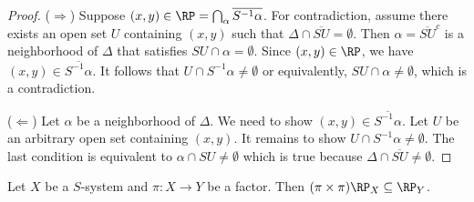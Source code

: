 \begin{proof}
\leanok{}
($\Rightarrow$) Suppose $(x, y) \in \RP = \bigcap_{\alpha} \overline{S^{-1} \alpha}$. For contradiction, assume there exists an open set $U$ containing $(x, y)$ such that $\Delta \cap \overline{S U} = \emptyset$. Then $\alpha = \overline{S U}^c$ is a neighborhood of $\Delta$ that satisfies $SU \cap \alpha = \emptyset$. Since $(x, y) \in \RP$, we have $(x, y) \in \overline{S^{-1} \alpha}$. It follows that $U \cap S^{-1} \alpha \neq \emptyset$ or equivalently, $SU \cap \alpha \neq \emptyset$, which is a contradiction.

($\Leftarrow$) Let $\alpha$ be a neighborhood of $\Delta$. We need to show $(x, y) \in \overline {S^{-1} \alpha}$. Let $U$ be an arbitrary open set containing $(x, y)$. It remains to show $U \cap S^{-1} \alpha \neq \emptyset$. The last condition is equivalent to $\alpha \cap SU \neq \emptyset$ which is true because $\Delta \cap \overline{S U} \neq \emptyset$.



    
\end{proof}

\begin{lemma}
    \label{lemma_frp_functorial_property}
    \leanok{}
    Let $X$ be a $S$-system and $\pi: X \to Y$ be a factor.  Then $(\pi \times \pi) \RP_X \subseteq \RP_Y$.
\end{lemma}

